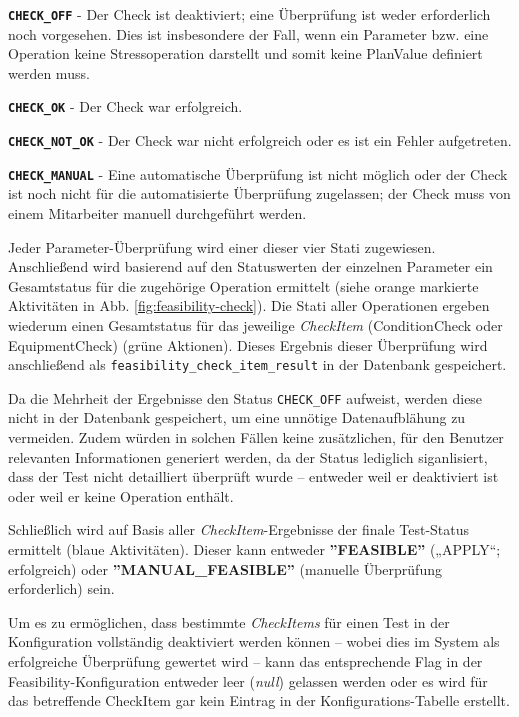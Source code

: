 \setlength{\leftskip}{1em}
\textbf{\texttt{CHECK\_OFF}} - Der Check ist deaktiviert; eine Überprüfung ist weder erforderlich noch vorgesehen. Dies ist insbesondere der Fall, wenn ein Parameter bzw. eine Operation keine Stressoperation darstellt und somit keine PlanValue definiert werden muss.

\textbf{\texttt{CHECK\_OK}} - Der Check war erfolgreich.

\textbf{\texttt{CHECK\_NOT\_OK}} - Der Check war nicht erfolgreich oder es ist ein Fehler aufgetreten.

\textbf{\texttt{CHECK\_MANUAL}} - Eine automatische Überprüfung ist nicht möglich oder der Check ist noch nicht für die automatisierte Überprüfung zugelassen; der Check muss von einem Mitarbeiter manuell durchgeführt werden.

\setlength{\leftskip}{0em} 

Jeder Parameter-Überprüfung wird einer dieser vier Stati zugewiesen. Anschließend wird basierend auf den Statuswerten der einzelnen Parameter ein Gesamtstatus für die zugehörige Operation ermittelt (siehe orange markierte Aktivitäten in Abb. \ref{fig:feasibility-check}). Die Stati aller Operationen ergeben wiederum einen Gesamtstatus für das jeweilige \textit{CheckItem} (\gls{ConditionCheck} oder \gls{EquipmentCheck}) (grüne Aktionen). Dieses Ergebnis dieser Überprüfung wird anschließend als \texttt{feasibility\_check\_item\_result} in der Datenbank gespeichert.

Da die Mehrheit der Ergebnisse den Status \texttt{CHECK\_OFF} aufweist, werden diese nicht in der Datenbank gespeichert, um eine unnötige Datenaufblähung zu vermeiden. Zudem würden in solchen Fällen keine zusätzlichen, für den Benutzer relevanten Informationen generiert werden, da der Status lediglich siganlisiert, dass der Test nicht detailliert überprüft wurde – entweder weil er deaktiviert ist oder weil er keine Operation enthält.

Schließlich wird auf Basis aller \textit{CheckItem}-Ergebnisse der finale Test-Status ermittelt (blaue Aktivitäten). Dieser kann entweder \textbf{''FEASIBLE''} („APPLY“; erfolgreich) oder \textbf{''MANUAL\_FEASIBLE''} (manuelle Überprüfung erforderlich) sein.

Um es zu ermöglichen, dass bestimmte \textit{CheckItems} für einen Test in der Konfiguration vollständig deaktiviert werden können – wobei dies im System als erfolgreiche Überprüfung gewertet wird – kann das entsprechende Flag in der Feasibility-Konfiguration entweder leer (\textit{null}) gelassen werden oder es wird für das betreffende CheckItem gar kein Eintrag in der Konfigurations-Tabelle erstellt. 

